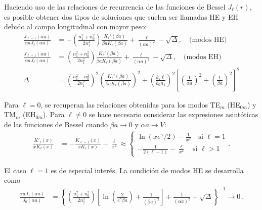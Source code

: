 Haciendo uso de las relaciones de recurrencia de las funciones de Bessel $J_\ell(r)$,  es posible obtener dos tipos de soluciones que suelen ser llamadas HE y EH debido al campo longitudinal con mayor peso:
\begin{align}
		\frac{J_{\ell-1}(\alpha a)}{\alpha a J_\ell(\alpha a)} &= -\left(\frac{n_1^2+n_0^2}{2n_1^2}\right) \frac{K_\ell'(\beta a)}{\beta a K_\ell(\beta a)}+\frac{\ell}{(\alpha a)^2}-\sqrt{\Delta}, \quad \text{(modos HE)}
		\label{eqn:HE}
	\\
		\frac{J_{\ell+1}(\alpha a)}{\alpha a J_\ell(\alpha a)} &= \left(\frac{n_1^2+n_0^2}{2n_1^2}\right) \frac{K_\ell'(\beta a)}{\beta a K_\ell(\beta a)}+\frac{\ell}{(\alpha a)^2}-\sqrt{\Delta}, \quad \text{(modos EH)}
		\label{eqn:EH}
		\\
		\Delta &= \left(\frac{n_1^2-n_0^2}{2n_1^2}\right)^2\left(\frac{K_\ell'(\beta a)}{\beta a K_\ell(\beta a)}\right)^2+ \left( \frac{ k_z \ell}{ k_0 n_1} \right)^2\left[ \left(\frac{1}{\alpha a}\right)^2 + \left(\frac{1}{\beta a}\right)^2 \right]^2 \nonumber
\end{align}

Para $\ell = 0$, se recuperan las relaciones obtenidas para los modos  TE$_m$ (HE$_{0m}$) y TM$_m$ (EH$_{0m}$). Para $\ell \neq 0$ se hace necesario considerar las expresiones asintóticas de las funciones de Bessel cuando $\beta a \to 0$ y $\alpha a \to V$:
\begin{align*}
	\frac{K'_\ell (x)}{xK_\ell (x)} &= -\frac{K_{\ell-1} (x)}{xK_\ell (x)}-\frac{\ell}{x^2}\approx \left\{\begin{matrix}
	\ln(xe^\gamma/2)-\frac{1}{x^2} \quad\text{si }\ell = 1
	\\
	-\frac{
	1}{2(\ell-1)}-\frac{\ell}{x^2}\quad \text{si }\ell > 1
	\end{matrix}\right. .
\end{align*}


El caso $\ell=1$ es de especial interés. La condición de modos HE se desarrolla como
\begin{align*}
	\frac{\alpha a J_1(\alpha a)}{J_0(\alpha a)} &= \left\{\left(\frac{n_1^2+n_0^2}{2n_1^2}\right) \left[ \ln\left(\frac{2}{e^\gamma \beta a}\right)+\frac{1}{(\beta a)^2} \right]+\frac{1}{(\alpha a)^2}-\sqrt{\Delta}\right\}^{-1} \to 0 \ .
\end{align*}

